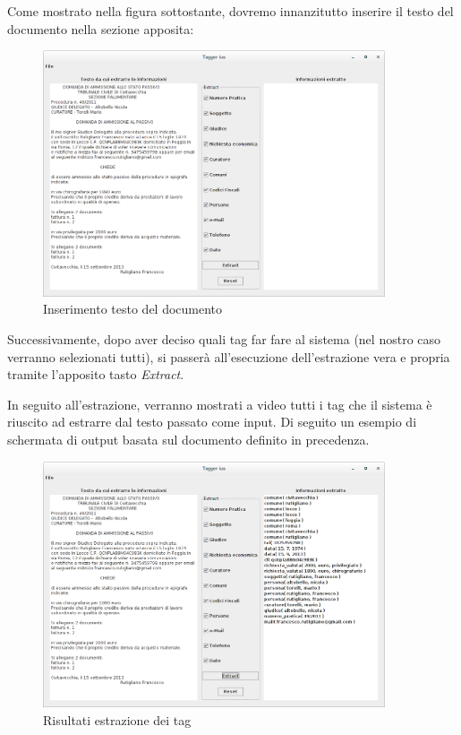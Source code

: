 Come mostrato nella figura sottostante, dovremo innanzitutto inserire il testo del documento nella sezione apposita:
\begin{figure}[H]
	\centering
	\includegraphics[width=0.9\textwidth]{img/interfaces/java-document.png}
	\caption[[Schermata java document]{Inserimento testo del documento}
	\label{java-doc}
\end{figure}

Successivamente, dopo aver deciso quali tag far fare al sistema (nel nostro caso verranno selezionati tutti), si passerà all'esecuzione dell'estrazione vera e propria tramite l'apposito tasto \emph{Extract}.

In seguito all'estrazione, verranno mostrati a video tutti i tag che il sistema è riuscito ad estrarre dal testo passato come input. Di seguito un esempio di schermata di output basata sul documento definito in precedenza.

\begin{figure}[H]
	\centering
	\includegraphics[width=0.9\textwidth]{img/interfaces/java-result.png}
	\caption[Schermata java result]{Risultati estrazione dei tag}
	\label{java-result}
\end{figure}

